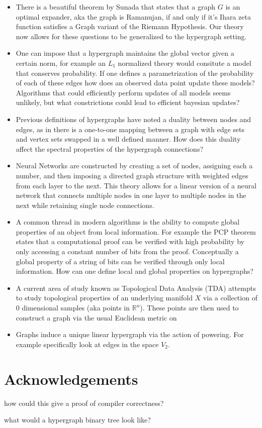 \documentclass{article}
\begin{document}
\begin{itemize}
    \item There is a beautiful theorem by Sunada that states that a graph $G$ is an optimal expander, aka the graph is Ramanujan, if and only if it's Ihara zeta function satisfies a Graph variant of the Riemann Hypothesis. Our theory now allows for these questions to be generalized to the hypergraph setting.
    \item One can impose that a hypergraph maintains the global vector given a certain norm, for example an $L_1$ normalized theory would consitute a model that conserves probability. If one defines a parametrization of the probability of each of these edges how does an observed data point update these models? Algorithms that could efficiently perform updates of all models seems unlikely, but what constrictions could lead to efficient bayesian updates?
    \item Previous definitions of hypergraphs have noted a duality between nodes and edges, as in there is a one-to-one mapping between a graph with edge sets and vertex sets swapped in a well defined manner. How does this duality affect the spectral properties of the hypergraph connections?
    \item Neural Networks are constructed by creating a set of nodes, assigning each a number, and then imposing a directed graph structure with weighted edges from each layer to the next. This theory allows for a linear version of a neural network that connects multiple nodes in one layer to multiple nodes in the next while retaining single node connections.
    \item A common thread in modern algorithms is the ability to compute global properties of an object from local information. For example the PCP theorem states that a computational proof can be verified with high probability by only accessing a constant number of bits from the proof. Conceptually a global property of a string of bits can be verified through only local information. How can one define local and global properties on hypergraphs?
    \item  A current area of study known as Topological Data Analysis (TDA) attempts to study topological properties of an underlying manifold $X$ via a collection of 0 dimensional samples (aka points in $\mathbb{R}^n$). These points are then used to construct a graph via the usual Euclidean metric on
    \item Graphs induce a unique linear hypergraph via the action of powering. For example specifically look at edges in the space $V_2$.  
\end{itemize}

\section*{Acknowledgements}

how could this give a proof of compiler correctness?

what would a hypergraph binary tree look like?
\end{document}

